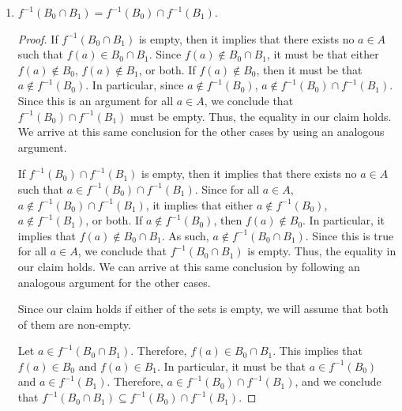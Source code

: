 \documentclass[12pt]{article}
\begin{document}
\begin{enumerate}[label=(\alph*)]
\begin{proof}
		Let $a \in f^{-1}(B_0) \cup f^{-1}(B_1)$. Note that either $a \in f^{-1}(B_0)$,
		$a \in f^{-1}(B_1)$, or both. If $a \in f^{-1}(B_0)$, then $f(a) \in B_0$.
		Note that $B_0 \subseteq B_0 \cup B_1$. Therefore, $f(a) \in B_0 \cup B_1$.
		In particular, $a \in f^{-1}(B_0 \cup B_1)$ and we can conclude that 
		$f^{-1}(B_0) \cup f^{-1}(B_1) \subseteq f^{-1}(B_0 \cup B_1)$. We will arrive
		at this same conclusion by using an analogous argument for the other cases.
		
		Therefore, we conclude that $f^{-1}(B_0 \cup B_1) = f^{-1}(B_0) \cup f^{-1}(B_1)$.
	\end{proof}
	\pagebreak
	\item $f^{-1}(B_0 \cap B_1) = f^{-1}(B_0) \cap f^{-1}(B_1)$.
	\begin{proof}
		If $f^{-1}(B_0 \cap B_1)$ is empty, then it implies that there exists no $a \in A$
		such that $f(a) \in B_0 \cap B_1$. Since $f(a) \notin B_0 \cap B_1$, it must
		be that either $f(a) \notin B_0$, $f(a) \notin B_1$, or both. If $f(a) \notin B_0$,
		then it must be that $a \notin f^{-1}(B_0)$. In particular, since $
		a \notin f^{-1}(B_0)$, $a \notin f^{-1}(B_0) \cap f^{-1}(B_1)$. Since this is 
		an argument for all $a \in A$, we conclude that $f^{-1}(B_0) \cap f^{-1}(B_1)$
		must be empty. Thus, the equality in our claim holds. We arrive at this same 
		conclusion for the other cases by using an analogous argument.
		
		If $f^{-1}(B_0) \cap f^{-1}(B_1)$ is empty, then it implies that there exists
		no $a \in A$ such that $a \in f^{-1}(B_0) \cap f^{-1}(B_1)$. Since for all
		$a \in A$, $a \notin f^{-1}(B_0) \cap f^{-1}(B_1)$, it implies that 
		either $a \notin f^{-1}(B_0)$, $a \notin f^{-1}(B_1)$, or both. 
		If $a \notin f^{-1}(B_0)$, then $f(a) \notin B_0$. In particular, it implies 
		that $f(a) \notin B_0 \cap B_1$. As such, $a \notin f^{-1}(B_0 \cap B_1)$.
		Since this is true for all $a \in A$, we conclude that $f^{-1}(B_0 \cap B_1)$
		is empty. Thus, the equality in our claim holds. We can arrive at this same
		conclusion by following an analogous argument for the other cases.
		
		Since our claim holds if either of the sets is empty, we will assume that both
		of them are non-empty.
		
		Let $a \in f^{-1}(B_0 \cap B_1)$. Therefore, $f(a) \in B_0 \cap B_1$.
		This implies that $f(a) \in B_0$ and $f(a) \in B_1$. In particular, it must be
		that $a \in f^{-1}(B_0)$ and $a \in f^{-1}(B_1)$. Therefore, 
		$a \in f^{-1}(B_0) \cap f^{-1}(B_1)$, and we conclude that 
		$f^{-1}(B_0 \cap B_1) \subseteq f^{-1}(B_0) \cap f^{-1}(B_1)$.
		

\end{proof}
\end{enumerate}
\end{document}
